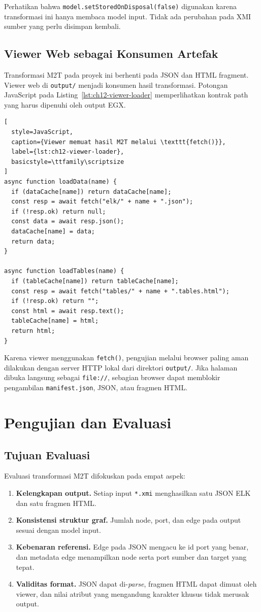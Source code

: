 Perhatikan bahwa \texttt{model.setStoredOnDisposal(false)} digunakan karena transformasi ini hanya membaca model input. Tidak ada perubahan pada XMI sumber yang perlu disimpan kembali.

\subsection{Viewer Web sebagai Konsumen Artefak}

Transformasi M2T pada proyek ini berhenti pada JSON dan HTML fragment. Viewer web di \texttt{output/} menjadi konsumen hasil transformasi. Potongan JavaScript pada Listing~\ref{lst:ch12-viewer-loader} memperlihatkan kontrak path yang harus dipenuhi oleh output EGX.

\begin{lstlisting}[
  style=JavaScript,
  caption={Viewer memuat hasil M2T melalui \texttt{fetch()}},
  label={lst:ch12-viewer-loader},
  basicstyle=\ttfamily\scriptsize
]
async function loadData(name) {
  if (dataCache[name]) return dataCache[name];
  const resp = await fetch("elk/" + name + ".json");
  if (!resp.ok) return null;
  const data = await resp.json();
  dataCache[name] = data;
  return data;
}

async function loadTables(name) {
  if (tableCache[name]) return tableCache[name];
  const resp = await fetch("tables/" + name + ".tables.html");
  if (!resp.ok) return "";
  const html = await resp.text();
  tableCache[name] = html;
  return html;
}
\end{lstlisting}

Karena viewer menggunakan \texttt{fetch()}, pengujian melalui browser paling aman dilakukan dengan server HTTP lokal dari direktori \texttt{output/}. Jika halaman dibuka langsung sebagai \texttt{file://}, sebagian browser dapat memblokir pengambilan \texttt{manifest.json}, JSON, atau fragmen HTML.

\section{Pengujian dan Evaluasi}

\subsection{Tujuan Evaluasi}

Evaluasi transformasi M2T difokuskan pada empat aspek:
\begin{enumerate}
  \item \textbf{Kelengkapan output.} Setiap input \texttt{*.xmi} menghasilkan satu JSON ELK dan satu fragmen HTML.
  \item \textbf{Konsistensi struktur graf.} Jumlah node, port, dan edge pada output sesuai dengan model input.
  \item \textbf{Kebenaran referensi.} Edge pada JSON mengacu ke id port yang benar, dan metadata edge menampilkan node serta port sumber dan target yang tepat.
  \item \textbf{Validitas format.} JSON dapat di-\textit{parse}, fragmen HTML dapat dimuat oleh viewer, dan nilai atribut yang mengandung karakter khusus tidak merusak output.
\end{enumerate}

